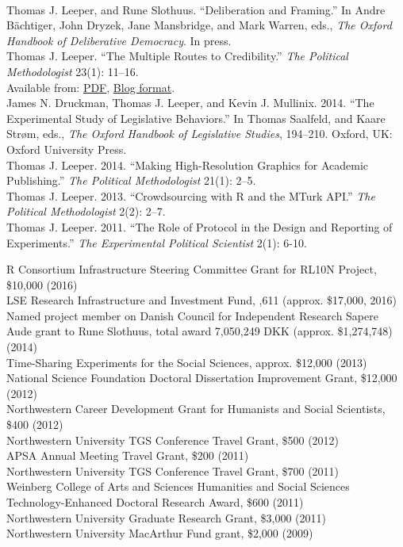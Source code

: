 \documentclass[12pt]{article}
\renewcommand{\section}[1]{\pagebreak[3]%
    \llap{\scshape\smash{\parbox[t]{\marginparwidth}{\raggedright {\color{lg}#1}}}}%
    \vspace{-\baselineskip}\par}
\newcommand{\topic}[1]{\pagebreak[3]\indent {\color{lg}{\footnotesize #1 }}\\}
\newcommand{\entry}[1]{\indent {\color{lg}\guillemotright}\hspace{2pt}#1\vspace{.25em}\\}
\begin{document}
\topic{Other Publications}
	\entry{Thomas J. Leeper, and Rune Slothuus. ``Deliberation and Framing.'' In Andre B{\"a}chtiger, John Dryzek, Jane Mansbridge, and Mark Warren, eds., \textit{The Oxford Handbook of Deliberative Democracy}. In press.}
	\entry{Thomas J. Leeper. ``The Multiple Routes to Credibility.'' \textit{The Political Methodologist} 23(1): 11--16.\\ Available from: \href{https://thepoliticalmethodologist.files.wordpress.com/2016/02/tpm_v23_n1.pdf}{PDF}, \href{https://thepoliticalmethodologist.com/2015/12/21/the-multiple-routes-to-credibility/}{Blog format}.}
	\entry{James N. Druckman, Thomas J. Leeper, and Kevin J. Mullinix. 2014. ``The Experimental Study of Legislative Behaviors.'' In Thomas Saalfeld, and Kaare Str\o m, eds., {\em The Oxford Handbook of Legislative Studies}, 194--210. Oxford, UK: Oxford University Press.}
	\entry{Thomas J. Leeper. 2014. ``Making High-Resolution Graphics for Academic Publishing.'' {\em The Political Methodologist} 21(1): 2--5.}
	\entry{Thomas J. Leeper. 2013. ``Crowdsourcing with R and the MTurk API.'' {\em The Political Methodologist} 2(2): 2--7.}
	\entry{Thomas J. Leeper. 2011. ``The Role of Protocol in the Design and Reporting of Experiments.'' {\em The Experimental Political Scientist} 2(1): 6-10.}%


\section{Grants\\and\\Funding}
\entry{R Consortium Infrastructure Steering Committee Grant for RL10N Project, \$10,000 (2016)}
\entry{LSE Research Infrastructure and Investment Fund, \textsterling 11,611 (approx. \$17,000, 2016)}
\entry{Named project member on Danish Council for Independent Research Sapere Aude grant to Rune Slothuus, total award 7,050,249 DKK (approx. \$1,274,748) (2014)}
\entry{Time-Sharing Experiments for the Social Sciences, approx. \$12,000 (2013)}
\entry{National Science Foundation Doctoral Dissertation Improvement Grant, \$12,000 (2012)}
\entry{Northwestern Career Development Grant for Humanists and Social Scientists, \$400 (2012)}
\entry{Northwestern University TGS Conference Travel Grant, \$500 (2012)}
\entry{APSA Annual Meeting Travel Grant, \$200 (2011)}
\entry{Northwestern University TGS Conference Travel Grant, \$700 (2011)}
\entry{Weinberg College of Arts and Sciences Humanities and Social Sciences Technology-Enhanced Doctoral Research Award, \$600 (2011)}
\entry{Northwestern University Graduate Research Grant, \$3,000 (2011)}
\entry{Northwestern University MacArthur Fund grant, \$2,000 (2009)}
\end{document}
